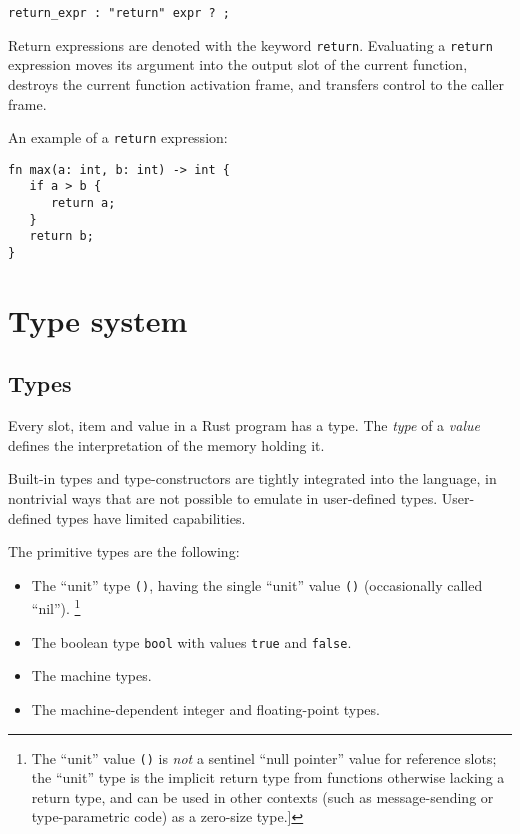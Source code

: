 \documentclass[]{article}
\begin{document}

\begin{verbatim}
return_expr : "return" expr ? ;
\end{verbatim}

Return expressions are denoted with the keyword \texttt{return}.
Evaluating a \texttt{return} expression moves its argument into the
output slot of the current function, destroys the current function
activation frame, and transfers control to the caller frame.

An example of a \texttt{return} expression:

\begin{verbatim}
fn max(a: int, b: int) -> int {
   if a > b {
      return a;
   }
   return b;
}
\end{verbatim}

\section{Type system}\label{type-system}

\subsection{Types}\label{types-1}

Every slot, item and value in a Rust program has a type. The \emph{type}
of a \emph{value} defines the interpretation of the memory holding it.

Built-in types and type-constructors are tightly integrated into the
language, in nontrivial ways that are not possible to emulate in
user-defined types. User-defined types have limited capabilities.


The primitive types are the following:

\begin{itemize}
\itemsep1pt\parskip0pt
\item
  The ``unit'' type \texttt{()}, having the single ``unit'' value
  \texttt{()} (occasionally called ``nil''). \footnote{The ``unit''
    value \texttt{()} is \emph{not} a sentinel ``null pointer'' value
    for reference slots; the ``unit'' type is the implicit return type
    from functions otherwise lacking a return type, and can be used in
    other contexts (such as message-sending or type-parametric code) as
    a zero-size type.{]}}
\item
  The boolean type \texttt{bool} with values \texttt{true} and
  \texttt{false}.
\item
  The machine types.
\item
  The machine-dependent integer and floating-point types.
\end{itemize}
\end{document}
